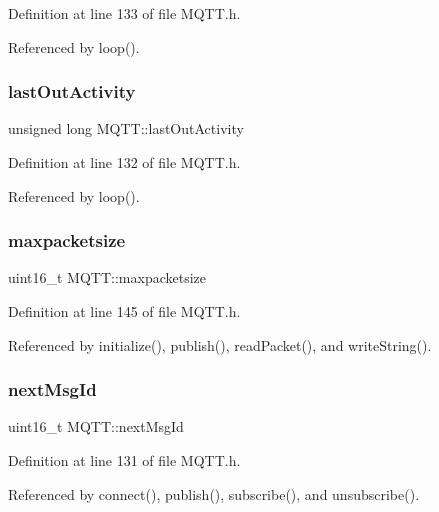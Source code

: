 Definition at line 133 of file M\+Q\+T\+T.\+h.



Referenced by loop().

\mbox{\label{class_m_q_t_t_a58a1c0a26b1de2522b79627b224bf1f6}} 
\subsubsection{last\+Out\+Activity}
{\footnotesize\ttfamily unsigned long M\+Q\+T\+T\+::last\+Out\+Activity\hspace{0.3cm}{\ttfamily [private]}}



Definition at line 132 of file M\+Q\+T\+T.\+h.



Referenced by loop().

\mbox{\label{class_m_q_t_t_aac8cf32807b542ce45a9060d9769f35e}} 
\subsubsection{maxpacketsize}
{\footnotesize\ttfamily uint16\+\_\+t M\+Q\+T\+T\+::maxpacketsize\hspace{0.3cm}{\ttfamily [private]}}



Definition at line 145 of file M\+Q\+T\+T.\+h.



Referenced by initialize(), publish(), read\+Packet(), and write\+String().

\mbox{\label{class_m_q_t_t_ade1e9fc252b7ca59f30be31439ff84ab}} 
\subsubsection{next\+Msg\+Id}
{\footnotesize\ttfamily uint16\+\_\+t M\+Q\+T\+T\+::next\+Msg\+Id\hspace{0.3cm}{\ttfamily [private]}}



Definition at line 131 of file M\+Q\+T\+T.\+h.



Referenced by connect(), publish(), subscribe(), and unsubscribe().

